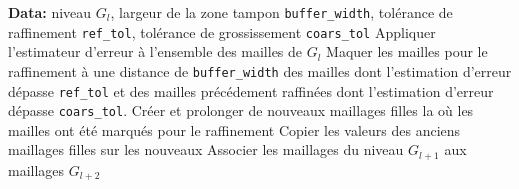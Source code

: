 \begin{algorithmic}
    \STATE \textbf{Data:} niveau \(G_l\), largeur de la zone tampon \texttt{buffer\_width}, tolérance de raffinement \texttt{ref\_tol}, tolérance de grossissement \texttt{coars\_tol} 
    \STATE Appliquer l'estimateur d'erreur à l'ensemble des mailles de \(G_l\)
    \STATE Maquer les mailles pour le raffinement à une distance de \texttt{buffer\_width} des mailles dont l'estimation d'erreur dépasse \texttt{ref\_tol} et des mailles précédement raffinées dont l'estimation d'erreur dépasse \texttt{coars\_tol}.
    \STATE Créer et prolonger de nouveaux maillages filles la où les mailles ont été marqués pour le raffinement
    \STATE Copier les valeurs des anciens maillages filles sur les nouveaux
    \STATE Associer les maillages du niveau \(G_{l+1}\) aux maillages \(G_{l+2}\)
\end{algorithmic}